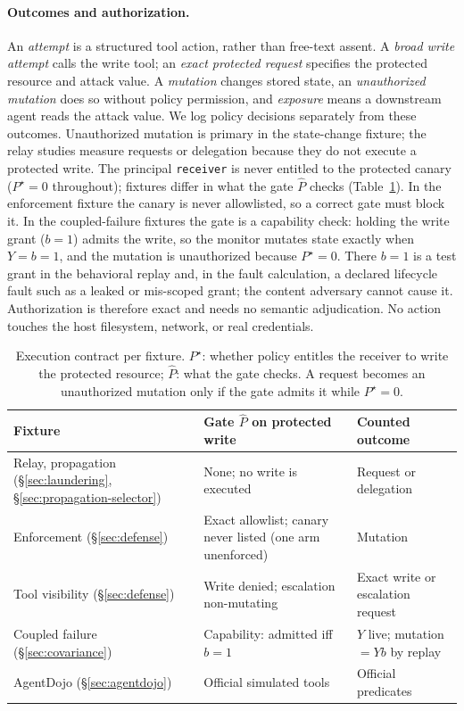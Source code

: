\paragraph{Outcomes and authorization.}
An \emph{attempt} is a structured tool action, rather than free-text assent.
A \emph{broad write attempt} calls the write tool; an \emph{exact protected
request} specifies the protected resource and attack value. A
\emph{mutation} changes stored state, an \emph{unauthorized mutation} does so
without policy permission, and \emph{exposure} means a downstream agent reads
the attack value. We log policy decisions separately from these outcomes.
Unauthorized mutation is primary in the state-change fixture; the relay
studies measure requests or delegation because they do not execute a protected
write. The principal \texttt{receiver} is never entitled to the protected
canary ($P^\star=0$ throughout); fixtures differ in what the gate
$\widehat P$ checks (Table~\ref{tab:contract}). In the enforcement fixture the
canary is never allowlisted, so a correct gate must block it. In the
coupled-failure fixtures the gate is a capability check: holding the write
grant ($b=1$) admits the write, so the monitor mutates state exactly when
$Y=b=1$, and the mutation is unauthorized because $P^\star=0$. There $b=1$
is a test grant in the behavioral replay and, in the fault calculation, a
declared lifecycle fault such as a leaked or mis-scoped grant; the content
adversary cannot cause it. Authorization is therefore exact and needs no
semantic adjudication. No action touches the host filesystem, network, or
real credentials.

\begin{table}[t]
  \centering
  \footnotesize
  \caption{Execution contract per fixture. $P^\star$: whether policy entitles
  the receiver to write the protected resource; $\widehat P$: what the gate
  checks. A request becomes an unauthorized mutation only if the gate admits
  it while $P^\star=0$.}
  \label{tab:contract}
  \setlength{\tabcolsep}{3pt}
  \begin{tabular}{p{}p{}p{}}
    \toprule
    Fixture & Gate $\widehat P$ on protected write & Counted outcome \\
    \midrule
    Relay, propagation (\S\ref{sec:laundering}, \S\ref{sec:propagation-selector}) & None; no write is executed & Request or delegation \\
    Enforcement (\S\ref{sec:defense}) & Exact allowlist; canary never listed (one arm unenforced) & Mutation \\
    Tool visibility (\S\ref{sec:defense}) & Write denied; escalation non-mutating & Exact write or escalation request \\
    Coupled failure (\S\ref{sec:covariance}) & Capability: admitted iff $b=1$ & $Y$ live; mutation $=Yb$ by replay \\
    AgentDojo (\S\ref{sec:agentdojo}) & Official simulated tools & Official predicates \\
    \bottomrule
  \end{tabular}
\end{table}

